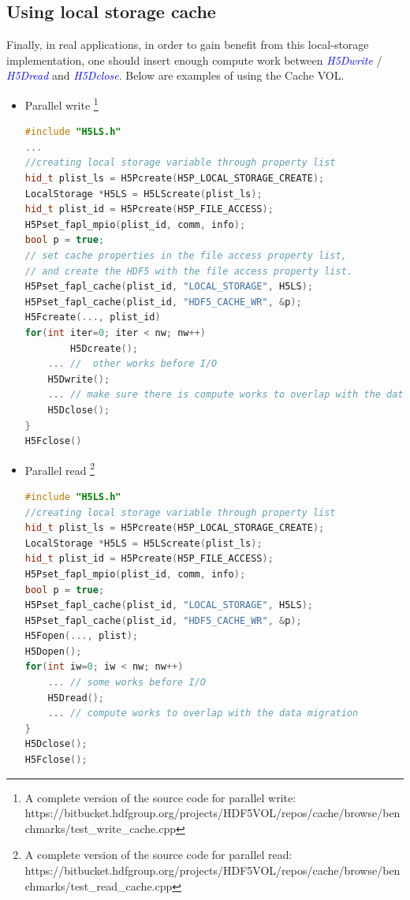 \documentclass[aps, prb, 11pt, notitlepage]{revtex4-1}
\def\function#1{\textcolor{blue}{{\it #1}}}
\begin{document}
\subsection{Using local storage cache}
Finally, in real applications, in order to gain benefit from this local-storage implementation,  one should insert enough compute work between \function{H5Dwrite} /  \function{H5Dread} and \function{H5Dclose}. Below are examples of using the Cache VOL.
\begin{itemize}
\item Parallel write \footnote{A complete version of the source code for parallel write: \\https://bitbucket.hdfgroup.org/projects/HDF5VOL/repos/cache/browse/benchmarks/test\_write\_cache.cpp} 
\begin{lstlisting}[language=C++]
#include "H5LS.h"
...
//creating local storage variable through property list
hid_t plist_ls = H5Pcreate(H5P_LOCAL_STORAGE_CREATE); 
LocalStorage *H5LS = H5LScreate(plist_ls);
hid_t plist_id = H5Pcreate(H5P_FILE_ACCESS);
H5Pset_fapl_mpio(plist_id, comm, info);
bool p = true;
// set cache properties in the file access property list, 
// and create the HDF5 with the file access property list.
H5Pset_fapl_cache(plist_id, "LOCAL_STORAGE", H5LS);
H5Pset_fapl_cache(plist_id, "HDF5_CACHE_WR", &p);
H5Fcreate(..., plist_id)
for(int iter=0; iter < nw; nw++)
        H5Dcreate(); 
	... //  other works before I/O
	H5Dwrite(); 
	... // make sure there is compute works to overlap with the data migration
	H5Dclose();
}
H5Fclose()
\end{lstlisting}
\item Parallel read \footnote{A complete version of the source code for parallel read: \\https://bitbucket.hdfgroup.org/projects/HDF5VOL/repos/cache/browse/benchmarks/test\_read\_cache.cpp} 
\begin{lstlisting}[language=C++]
#include "H5LS.h"
//creating local storage variable through property list
hid_t plist_ls = H5Pcreate(H5P_LOCAL_STORAGE_CREATE);
LocalStorage *H5LS = H5LScreate(plist_ls);
hid_t plist_id = H5Pcreate(H5P_FILE_ACCESS);
H5Pset_fapl_mpio(plist_id, comm, info);
bool p = true;
H5Pset_fapl_cache(plist_id, "LOCAL_STORAGE", H5LS);
H5Pset_fapl_cache(plist_id, "HDF5_CACHE_WR", &p);
H5Fopen(..., plist);
H5Dopen();
for(int iw=0; iw < nw; nw++)
	... // some works before I/O
	H5Dread();
	... // compute works to overlap with the data migration
}
H5Dclose();
H5Fclose();
\end{lstlisting}
\end{itemize}
\end{document}
